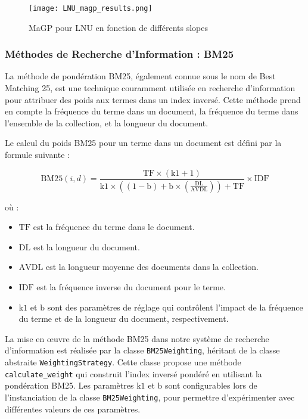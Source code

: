 \documentclass[a4paper, 12pt]{article}
\begin{document}
\begin{figure}
    \centering
    \texttt{[image: LNU\_magp\_results.png]}
    \caption{MaGP pour LNU en fonction de différents slopes}
    \label{fig:lnu_results}
\end{figure}

\newpage


\newpage

\subsubsection{Méthodes de Recherche d'Information : BM25}

La méthode de pondération BM25, également connue sous le nom de Best Matching 25,
est une technique couramment utilisée en recherche d'information pour attribuer des poids aux termes dans un index inversé.
Cette méthode prend en compte la fréquence du terme dans un document, la fréquence du terme dans l'ensemble de la collection,
et la longueur du document.

Le calcul du poids BM25 pour un terme dans un document est défini par la formule suivante :

\begin{equation}
\text{BM25}(i, d) = \frac{{\text{TF} \times (\text{k1} + 1)}}{{\text{k1} \times \left((1 - \text{b}) + \text{b} \times \left(\frac{\text{DL}}{\text{AVDL}}\right)\right) + \text{TF}}} \times \text{IDF}
\end{equation}

où :
\begin{itemize}
    \item $\text{TF}$ est la fréquence du terme dans le document.
    \item $\text{DL}$ est la longueur du document.
    \item $\text{AVDL}$ est la longueur moyenne des documents dans la collection.
    \item $\text{IDF}$ est la fréquence inverse du document pour le terme.
    \item $\text{k1}$ et $\text{b}$ sont des paramètres de réglage qui contrôlent l'impact de la fréquence du terme et de la longueur du document, respectivement. \\
\end{itemize}

La mise en œuvre de la méthode BM25 dans notre système de recherche d'information est réalisée par la  classe \texttt{BM25Weighting}, héritant de la classe abstraite \texttt{WeightingStrategy}. Cette classe propose une méthode \texttt{calculate\_weight} 
qui construit l'index inversé pondéré en utilisant la pondération BM25. 
Les paramètres $\text{k1}$ et $\text{b}$ sont configurables lors de l'instanciation de la classe \texttt{BM25Weighting}, pour permettre d'expérimenter avec différentes valeurs de ces paramètres.
\end{document}

